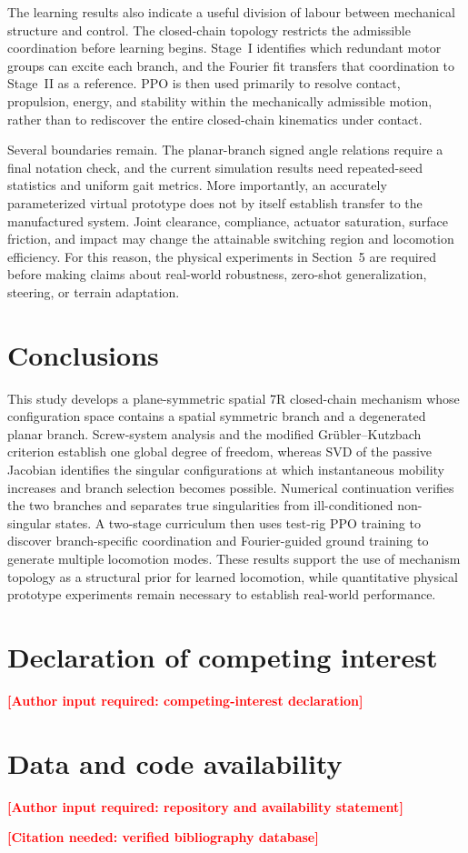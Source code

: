 \documentclass[a4paper,fleqn]{cas-sc}
\newcommand{\missing}[1]{\textcolor{red}{\textbf{[#1]}}}
\begin{document}
The learning results also indicate a useful division of labour between
mechanical structure and control. The closed-chain topology restricts the
admissible coordination before learning begins. Stage~I identifies which
redundant motor groups can excite each branch, and the Fourier fit transfers
that coordination to Stage~II as a reference. PPO is then used primarily to
resolve contact, propulsion, energy, and stability within the mechanically
admissible motion, rather than to rediscover the entire closed-chain
kinematics under contact.

Several boundaries remain. The planar-branch signed angle relations require a
final notation check, and the current simulation results need repeated-seed
statistics and uniform gait metrics. More importantly, an accurately
parameterized virtual prototype does not by itself establish transfer to the
manufactured system. Joint clearance, compliance, actuator saturation,
surface friction, and impact may change the attainable switching region and
locomotion efficiency. For this reason, the physical experiments in
Section~5 are required before making claims about real-world robustness,
zero-shot generalization, steering, or terrain adaptation.

\section{Conclusions}

This study develops a plane-symmetric spatial 7R closed-chain mechanism whose
configuration space contains a spatial symmetric branch and a degenerated
planar branch. Screw-system analysis and the modified
Gr\"ubler--Kutzbach criterion establish one global degree of freedom, whereas
SVD of the passive Jacobian identifies the singular configurations at which
instantaneous mobility increases and branch selection becomes possible.
Numerical continuation verifies the two branches and separates true
singularities from ill-conditioned non-singular states. A two-stage
curriculum then uses test-rig PPO training to discover branch-specific
coordination and Fourier-guided ground training to generate multiple
locomotion modes. These results support the use of mechanism topology as a
structural prior for learned locomotion, while quantitative physical
prototype experiments remain necessary to establish real-world performance.

\section*{Declaration of competing interest}
\missing{Author input required: competing-interest declaration}

\section*{Data and code availability}
\missing{Author input required: repository and availability statement}

% 
% 
\missing{Citation needed: verified bibliography database}
\end{document}
